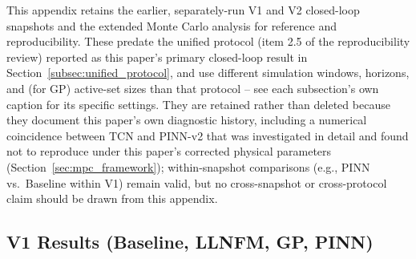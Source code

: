 \hspace{1.5cm} This appendix retains the earlier, separately-run V1 and V2
closed-loop snapshots and the extended Monte Carlo analysis for
reference and reproducibility. These predate the unified protocol
(item 2.5 of the reproducibility review) reported as this paper's
primary closed-loop result in
Section~\ref{subsec:unified_protocol}, and use different simulation
windows, horizons, and (for GP) active-set sizes than that protocol
-- see each subsection's own caption for its specific settings. They
are retained rather than deleted because they document this paper's
own diagnostic history, including a numerical coincidence between
TCN and PINN-v2 that was investigated in detail and found not to
reproduce under this paper's corrected physical parameters
(Section~\ref{sec:mpc_framework}); within-snapshot comparisons (e.g.,
PINN vs.\ Baseline within V1) remain valid, but no cross-snapshot or
cross-protocol claim should be drawn from this appendix.

\subsection{V1 Results (Baseline, LLNFM, GP, PINN)}
\label{subsec:v1_results}

